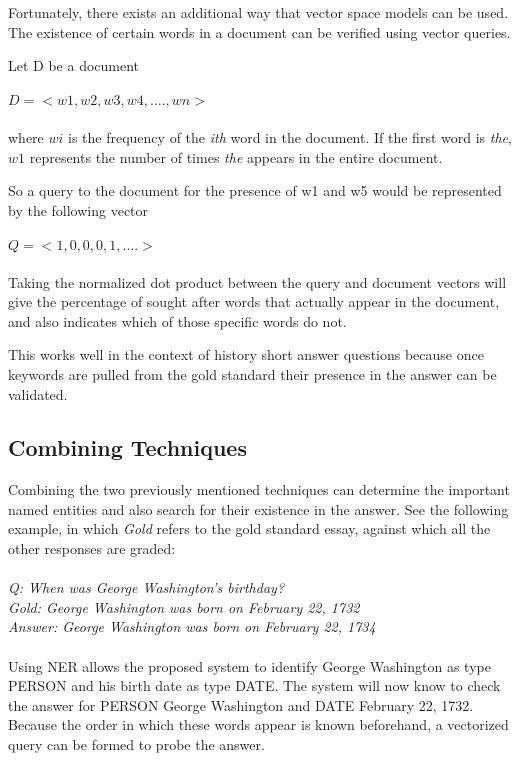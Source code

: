 Fortunately, there exists an additional way that vector space models can be used. The existence of certain words in a document can be verified using vector queries.

Let D be a document\\\\ $D = <w1, w2, w3, w4, ...., wn>$\\\\ where $wi$ is the frequency of the \textit{ith} word in the document. If the first word is \textit{the}, $w1$ represents the number of times \textit{the} appears in the entire document.

So a query to the document for the presence of w1 and w5 would be represented by the following vector 
\\\\
$Q=<1, 0, 0, 0, 1, ....>$
\\\\
Taking the normalized dot product between the query and document vectors will give the percentage of sought after words that actually appear in the document, and also indicates which of those specific words do not.

This works well in the context of history short answer questions because once keywords are pulled from the gold standard their presence in the answer can be validated.

\subsection{Combining Techniques}
Combining the two previously mentioned techniques can determine the important named entities and also search for their existence in the answer. See the following example, in which \textit{Gold} refers to the gold standard essay, against which all the other responses are graded:
\\\\
\textit{Q: When was George Washington's birthday?}\\
\textit{Gold: George Washington was born on February 22, 1732}\\
\textit{Answer: George Washington was born on February 22, 1734}
\\\\
Using NER allows the proposed system to identify George Washington as type PERSON and his birth date as type DATE. The system will now know to check the answer for PERSON George Washington and DATE February 22, 1732. Because the order in which these words appear is known beforehand, a vectorized query can be formed to probe the answer.

